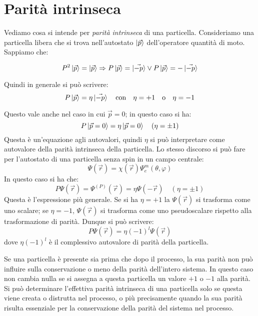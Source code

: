 \section{Parità intrinseca}
Vediamo cosa si intende per \emph{parità intrinseca} di 
una particella. Consideriamo una particella libera
che si trova nell'autostato $\ket{\vec{p}}$ dell'operatore quantità di moto. 
Sappiamo che:

\begin{equation}
 P^2 \ket{\vec{p}} = \ket{\vec{p}} \Rightarrow P\ket{\vec{p}} = \ket{\vec{-p}} 
\vee P\ket{\vec{p}} = -\ket{\vec{-p}}
\end{equation}

Quindi in generale si può scrivere:
\begin{equation}
 P\ket{\vec{p}} = \eta\ket{\vec{-p}} \quad\text{con} \quad\eta = +1 
\quad\text{o} \quad\eta = -1
\end{equation}

Questo vale anche nel caso in cui $\vec{p} = 0$; in questo caso si ha:
\begin{equation}
 P\ket{\vec{p} = 0} = \eta\ket{\vec{p} = 0} \quad (\eta = \pm1)
\end{equation}
Questa è un'equazione agli autovalori, quindi $\eta$ si può interpretare come 
autovalore della parità intrinseca della
particella. Lo stesso discorso si può fare per l'autostato di una particella 
senza spin in un campo centrale:
\begin{equation}
 \Psi(\vec{r}) = \chi(\vec{r}) \Psi_e^m(\theta, \varphi)
\end{equation}
In questo caso si ha che:
\begin{equation}
 P\Psi(\vec{r}) = \Psi^{(P)}(\vec{r}) = \eta \Psi(-\vec{r}) \quad (\eta = \pm1)
\end{equation}
Questa è l'espressione più generale. Se si ha $\eta = +1$ la $\Psi(\vec{r})$ 
si trasforma
come uno scalare; se $\eta = -1$, $\Psi(\vec{r})$ si trasforma come uno 
pseudoscalare rispetto alla trasformazione di parità.
Dunque si può scrivere:
\begin{equation}
 P\Psi(\vec{r}) = \eta(-1)^l \Psi(\vec{r})
\end{equation}
dove $\eta(-1)^l$ è il complessivo autovalore di parità della particella.

Se una particella è presente sia prima che dopo il processo, la sua parità 
non può influire sulla conservazione o meno della
parità dell'intero sistema. In questo caso non cambia nulla se si assegna a 
questa particella un valore $+1$ o $-1$ alla parità.
Si può determinare l'effettiva parità intrinseca di una particella solo se 
questa viene creata o distrutta nel processo, o più
precisamente quando la sua parità risulta essenziale per la conservazione 
della parità del sistema nel processo.

